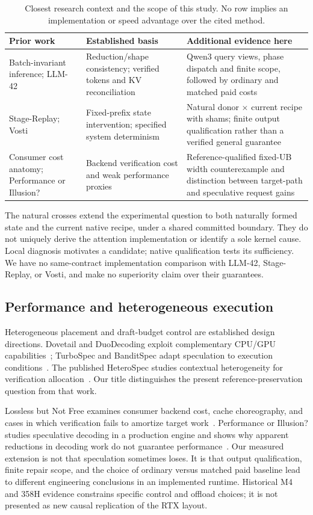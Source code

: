 \begin{table}[t]\centering\small
\caption{Closest research context and the scope of this study. No row implies an implementation or speed advantage over the cited method.}
\label{tab:related}
\begin{tabularx}{\linewidth}{@{}p{.23\linewidth}XX@{}}\toprule
Prior work & Established basis & Additional evidence here\\\midrule
Batch-invariant inference; LLM-42~\cite{thinkingmachines,llm42} & Reduction/shape consistency; verified tokens and KV reconciliation & Qwen3 query views, phase dispatch and finite scope, followed by ordinary and matched paid costs\\
Stage-Replay; Vosti~\cite{stagereplay,vosti} & Fixed-prefix state intervention; specified system determinism & Natural donor $\times$ current recipe with shams; finite output qualification rather than a verified general guarantee\\
Consumer cost anatomy; Performance or Illusion?~\cite{lossless,illusion} & Backend verification cost and weak performance proxies & Reference-qualified fixed-UB width counterexample and distinction between target-path and speculative request gains\\\bottomrule
\end{tabularx}
\end{table}

The natural crosses extend the experimental question to both naturally formed state and the current native recipe, under a shared committed boundary. They do not uniquely derive the attention implementation or identify a sole kernel cause. Local diagnosis motivates a candidate; native qualification tests its sufficiency. We have no same-contract implementation comparison with LLM-42, Stage-Replay, or Vosti, and make no superiority claim over their guarantees.

\subsection{Performance and heterogeneous execution}
Heterogeneous placement and draft-budget control are established design directions. Dovetail and DuoDecoding exploit complementary CPU/GPU capabilities~\cite{dovetail,duodecoding}; TurboSpec and BanditSpec adapt speculation to execution conditions~\cite{turbospec,banditspec}. The published HeteroSpec studies contextual heterogeneity for verification allocation~\cite{aclheterospec}. Our title distinguishes the present reference-preservation question from that work.

Lossless but Not Free examines consumer backend cost, cache choreography, and cases in which verification fails to amortize target work~\cite{lossless}. Performance or Illusion? studies speculative decoding in a production engine and shows why apparent reductions in decoding work do not guarantee performance~\cite{illusion}. Our measured extension is not that speculation sometimes loses. It is that output qualification, finite repair scope, and the choice of ordinary versus matched paid baseline lead to different engineering conclusions in an implemented runtime. Historical M4 and 358H evidence constrains specific control and offload choices; it is not presented as new causal replication of the RTX layout.
